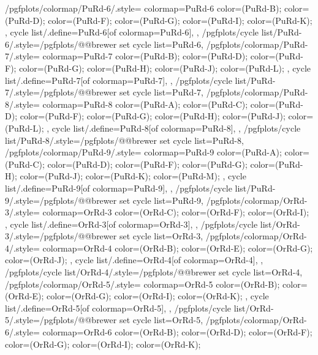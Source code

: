 {  %
  /pgfplots/colormap/PuRd-6/.style={
    colormap={PuRd-6}{
      color=(PuRd-B);
      color=(PuRd-D);
      color=(PuRd-F);
      color=(PuRd-G);
      color=(PuRd-I);
      color=(PuRd-K);
    },
    cycle list/.define={PuRd-6}{[of colormap=PuRd-6]},
  },
  /pgfplots/cycle list/PuRd-6/.style={/pgfplots/@@brewer set cycle list={PuRd-6}},
  /pgfplots/colormap/PuRd-7/.style={
    colormap={PuRd-7}{
      color=(PuRd-B);
      color=(PuRd-D);
      color=(PuRd-F);
      color=(PuRd-G);
      color=(PuRd-H);
      color=(PuRd-J);
      color=(PuRd-L);
    },
    cycle list/.define={PuRd-7}{[of colormap=PuRd-7]},
  },
  /pgfplots/cycle list/PuRd-7/.style={/pgfplots/@@brewer set cycle list={PuRd-7}},
  /pgfplots/colormap/PuRd-8/.style={
    colormap={PuRd-8}{
      color=(PuRd-A);
      color=(PuRd-C);
      color=(PuRd-D);
      color=(PuRd-F);
      color=(PuRd-G);
      color=(PuRd-H);
      color=(PuRd-J);
      color=(PuRd-L);
    },
    cycle list/.define={PuRd-8}{[of colormap=PuRd-8]},
  },
  /pgfplots/cycle list/PuRd-8/.style={/pgfplots/@@brewer set cycle list={PuRd-8}},
  /pgfplots/colormap/PuRd-9/.style={
    colormap={PuRd-9}{
      color=(PuRd-A);
      color=(PuRd-C);
      color=(PuRd-D);
      color=(PuRd-F);
      color=(PuRd-G);
      color=(PuRd-H);
      color=(PuRd-J);
      color=(PuRd-K);
      color=(PuRd-M);
    },
    cycle list/.define={PuRd-9}{[of colormap=PuRd-9]},
  },
  /pgfplots/cycle list/PuRd-9/.style={/pgfplots/@@brewer set cycle list={PuRd-9}},
  /pgfplots/colormap/OrRd-3/.style={
    colormap={OrRd-3}{
      color=(OrRd-C);
      color=(OrRd-F);
      color=(OrRd-I);
    },
    cycle list/.define={OrRd-3}{[of colormap=OrRd-3]},
  },
  /pgfplots/cycle list/OrRd-3/.style={/pgfplots/@@brewer set cycle list={OrRd-3}},
  /pgfplots/colormap/OrRd-4/.style={
    colormap={OrRd-4}{
      color=(OrRd-B);
      color=(OrRd-E);
      color=(OrRd-G);
      color=(OrRd-J);
    },
    cycle list/.define={OrRd-4}{[of colormap=OrRd-4]},
  },
  /pgfplots/cycle list/OrRd-4/.style={/pgfplots/@@brewer set cycle list={OrRd-4}},
  /pgfplots/colormap/OrRd-5/.style={
    colormap={OrRd-5}{
      color=(OrRd-B);
      color=(OrRd-E);
      color=(OrRd-G);
      color=(OrRd-I);
      color=(OrRd-K);
    },
    cycle list/.define={OrRd-5}{[of colormap=OrRd-5]},
  },
  /pgfplots/cycle list/OrRd-5/.style={/pgfplots/@@brewer set cycle list={OrRd-5}},
  /pgfplots/colormap/OrRd-6/.style={
    colormap={OrRd-6}{
      color=(OrRd-B);
      color=(OrRd-D);
      color=(OrRd-F);
      color=(OrRd-G);
      color=(OrRd-I);
      color=(OrRd-K);
}}}
